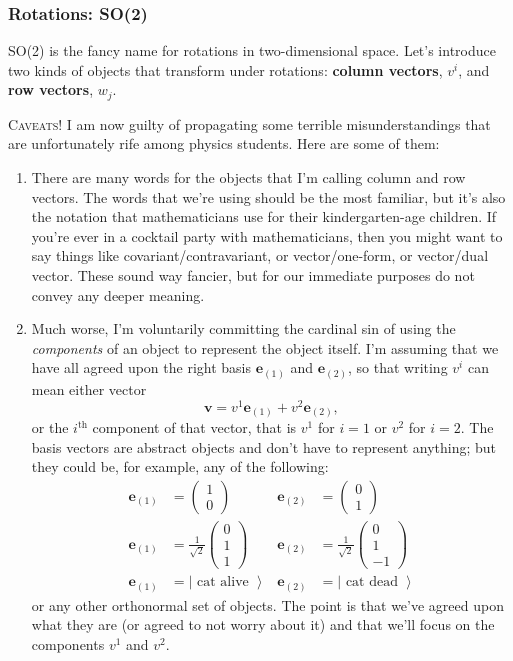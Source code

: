 \documentclass[12pt]{article}
\renewcommand{\vec}[1]{\mathbf{#1}} %
\begin{document}
\subsubsection{Rotations: SO(2)}

SO(2) is the fancy name for rotations in two-dimensional space. Let's introduce two kinds of objects that transform under rotations: \textbf{column vectors}, $v^i$, and \textbf{row vectors}, $w_j$.%

\begin{framed}
\textsc{Caveats!} I am now guilty of propagating some terrible misunderstandings that are unfortunately rife among physics students. Here are some of them:
\begin{enumerate}
	\item There are many words for the objects that I'm calling column and row vectors. The words that we're using should be the most familiar, but it's also the notation that mathematicians use for their kindergarten-age children. If you're ever in a cocktail party with mathematicians, then you might want to say things like covariant/contravariant, or vector/one-form, or vector/dual vector. These sound way fancier, but for our immediate purposes do not convey any deeper meaning. 
	\item Much worse, I'm voluntarily committing the cardinal sin of using the \emph{components} of an object to represent the object itself. I'm assuming that we have all agreed upon the right basis $\vec{e}_{(1)}$ and $\vec{e}_{(2)}$, so that writing $v^i$ can mean either vector $$\vec{v} = v^1 \vec{e}_{(1)} + v^2 \vec{e}_{(2)},$$ or the $i^\text{th}$ component of that vector, that is $v^1$ for $i=1$ or $v^2$ for $i=2$. The basis vectors are abstract objects and don't have to represent anything; but they could be, for example, any of the following:
\begin{align}
	\vec{e}_{(1)} & = \begin{pmatrix}1\\0\end{pmatrix}
	&
	\vec{e}_{(2)} & = \begin{pmatrix}0\\1\end{pmatrix}
	\\
	\vec{e}_{(1)} & = \frac{1}{\sqrt{2}}\begin{pmatrix}0\\1\\1\end{pmatrix}
	&
	\vec{e}_{(2)} & = \frac{1}{\sqrt{2}}\begin{pmatrix}0\\1\\-1\end{pmatrix}
	\\
	\vec{e}_{(1)} & = \left|\text{ cat alive } \right\rangle
	&
	\vec{e}_{(2)} & = \left|\text{ cat dead } \right\rangle
\end{align}
or any other orthonormal set of objects. The point is that we've agreed upon what they are (or agreed to not worry about it) and that we'll focus on the components $v^1$ and $v^2$.
\end{enumerate}
\end{framed}
\end{document}
